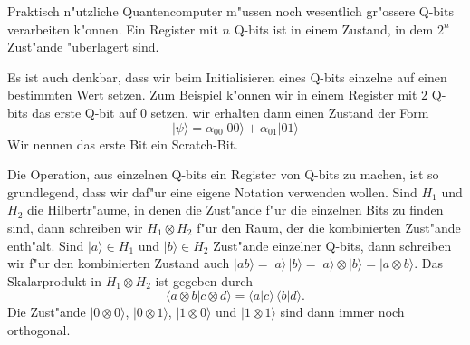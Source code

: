 Praktisch n"utzliche Quantencomputer m"ussen noch wesentlich gr"ossere
Q-bits verarbeiten k"onnen.
Ein Register mit $n$ Q-bits ist in einem Zustand, in dem $2^n$ Zust"ande
"uberlagert sind.

Es ist auch denkbar, dass wir beim Initialisieren eines Q-bits
einzelne auf einen bestimmten Wert setzen.
Zum Beispiel k"onnen wir in einem Register mit $2$ Q-bits das erste
Q-bit auf $0$ setzen, wir erhalten dann einen Zustand der
Form
\[
|\psi\rangle
=
\alpha_{00}|00\rangle
+
\alpha_{01}|01\rangle
\]
Wir nennen das erste Bit ein Scratch-Bit.

Die Operation, aus einzelnen Q-bits ein Register von Q-bits zu
machen, ist so grundlegend, dass wir daf"ur eine eigene Notation
verwenden wollen.
Sind $H_1$ und $H_2$ die Hilbertr"aume, in denen die Zust"ande f"ur
die einzelnen Bits zu finden sind, dann schreiben wir $H_1\otimes H_2$
f"ur den Raum, der die kombinierten Zust"ande enth"alt.
Sind $|a\rangle\in H_1$ und $|b\rangle\in H_2$ Zust"ande einzelner
Q-bits, dann schreiben wir f"ur den kombinierten Zustand auch
$|ab\rangle=|a\rangle\,|b\rangle=|a\rangle\otimes|b\rangle=|a\otimes b\rangle$.
Das Skalarprodukt in $H_1\otimes H_2$ ist gegeben durch
\[
\langle a\otimes b|c\otimes d\rangle
=
\langle a|c\rangle\,\langle b|d\rangle.
\]
Die Zust"ande $|0\otimes 0\rangle$,
$|0\otimes 1\rangle$,
$|1\otimes 0\rangle$ und
$|1\otimes 1\rangle$ sind dann immer noch orthogonal.

